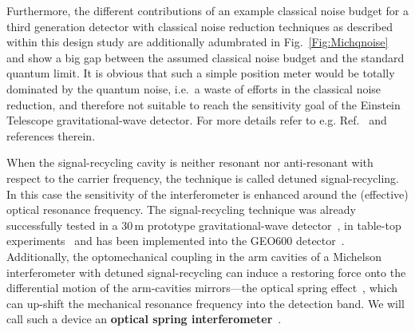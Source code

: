Furthermore, the different contributions of an
example classical noise budget for a third generation detector
with classical noise reduction techniques as described within this
design study are additionally adumbrated in
Fig.~\ref{Fig:Michqnoise} and show a big gap between the assumed
classical noise budget and the standard quantum limit. It is
obvious that such a simple position meter would be totally
dominated by the quantum noise, i.e.\ a waste of efforts in the
classical noise reduction, and therefore not suitable to reach the
sensitivity goal of the Einstein Telescope gravitational-wave
detector. For more details refer to e.g.
Ref.~\cite{Mueller-Ebhardt2009} and references therein.

When the signal-recycling cavity is neither resonant nor
anti-resonant with respect to the carrier frequency, the technique
is called detuned signal-recycling. In this case the sensitivity
of the interferometer is enhanced around the (effective) optical
resonance frequency. The signal-recycling technique was already
successfully tested in a 30\,m prototype gravitational-wave
detector~\cite{Heinzel1998,DualRecFreise2000}, in table-top
experiments~\cite{Somiya2005,Miyakawa2006} and has been
implemented into the GEO600 detector~\cite{Grote2004}.
Additionally, the optomechanical coupling in the arm cavities of a
Michelson interferometer with detuned signal-recycling can induce
a restoring force onto the differential motion of the arm-cavities
mirrors---the optical spring effect~\cite{Buonanno2001a}, which
can up-shift the mechanical resonance frequency into the detection
band. We will call such a device an {\bf optical spring
interferometer}~\cite{Buonanno2001a,Buonanno2002,Buonanno2003a,Rehbein2008}.
%
